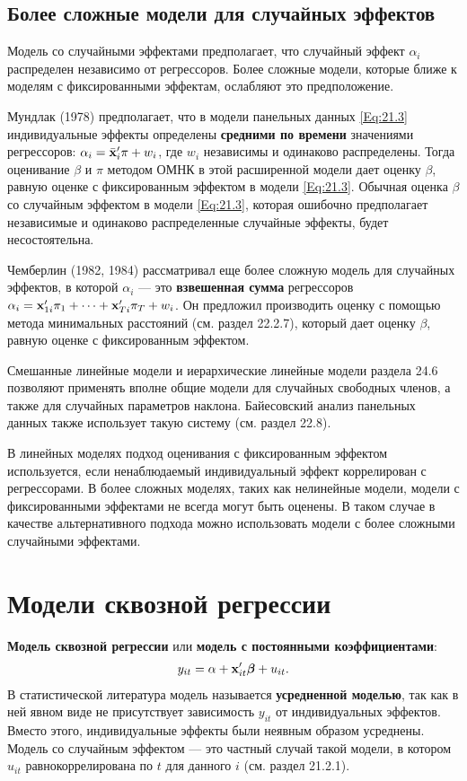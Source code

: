 \subsection{Более сложные модели для случайных эффектов}

Модель со случайными эффектами предполагает, что случайный эффект $\alpha_i$ распределен независимо от регрессоров. Более сложные модели, которые ближе к моделям с фиксированными эффектам, ослабляют это предположение. 

Мундлак (1978) предполагает, что в модели панельных данных \ref{Eq:21.3} индивидуальные эффекты определены \textbf{средними по времени} значениями регрессоров: $\alpha_i=\bar{\mathbf{x}}'_i\pi+w_i$, где $w_i$ независимы и одинаково распределены. Тогда оценивание $\beta$ и $\pi$ методом ОМНК в этой расширенной модели дает оценку $\beta$, равную оценке с фиксированным эффектом в модели \ref{Eq:21.3}. Обычная оценка $\beta$ со случайным эффектом в модели \ref{Eq:21.3}, которая ошибочно предполагает независимые и одинаково распределенные случайные эффекты, будет несостоятельна.

Чемберлин (1982, 1984) рассматривал еще более сложную модель для случайных эффектов, в которой $\alpha_i$ --- это \textbf{взвешенная сумма} регрессоров $\alpha_i=\mathbf{x}'_{1i}\pi_1+ \dots + \mathbf{x}'_{Ti} \pi_T+w_i$. Он предложил производить оценку с помощью метода минимальных расстояний (см. раздел 22.2.7), который дает оценку  $\beta$, равную оценке с фиксированным эффектом.

Смешанные линейные модели  и иерархические линейные модели раздела 24.6 позволяют применять вполне общие модели для случайных свободных членов, а также для случайных параметров наклона. Байесовский анализ панельных данных также использует такую систему (см. раздел 22.8).

В линейных моделях подход оценивания с фиксированным эффектом используется, если ненаблюдаемый индивидуальный эффект коррелирован с регрессорами. В более сложных моделях, таких как нелинейные модели, модели с фиксированными эффектами не всегда могут быть оценены. В таком случае в качестве альтернативного подхода можно использовать модели с более сложными случайными эффектами.

\section{Модели сквозной регрессии}

\textbf{Модель сквозной регрессии} или \textbf{модель с постоянными коэффициентами}:
\begin{align}
y_{it}=\alpha+\mathbf{x}'_{it}\bm\beta + u_{it}.
\label{Eq:21.17}
\end{align}
В статистической литература модель называется \textbf{усредненной моделью}, так как в ней явном виде не присутствует зависимость $y_{it}$ от индивидуальных эффектов. Вместо этого, индивидуальные эффекты были неявным образом усреднены. Модель со случайным эффектом  --- это частный случай такой модели, в котором $u_{it}$ равнокоррелирована по $t$ для данного $i$ (см. раздел 21.2.1).

